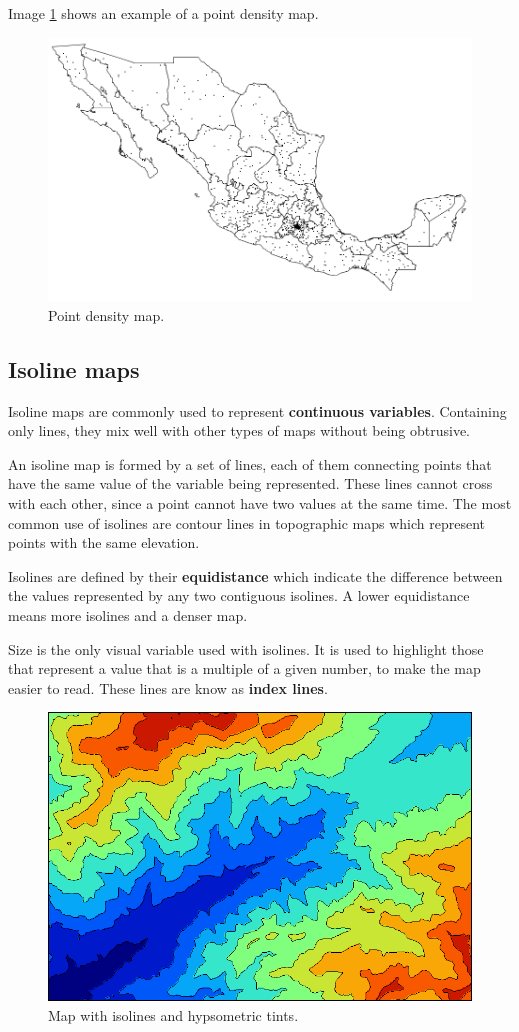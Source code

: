 Image \ref{Fig:MapPoints} shows an example of a point density map.


\begin{figure}[!hbt]
\centering
\includegraphics[width=.8\columnwidth]{Visualization/MapPoints.png}
\caption{\small Point density map.}
\label{Fig:MapPoints} 
\end{figure}


\subsection{Isoline maps}

Isoline maps are commonly used to represent \textbf{continuous variables}. Containing only lines, they mix well with other types of maps without being  obtrusive.

An isoline map is formed by a set of lines, each of them connecting points that have the same value of the variable being represented. These lines cannot cross with each other, since a point cannot have two values at the same time. The most common use of isolines are contour lines in topographic maps which represent points with the same elevation.

Isolines are defined by their \textbf{equidistance} which indicate the difference between the values represented by any two contiguous isolines. A lower equidistance means more isolines and a denser map.

Size is the only visual variable used with isolines. It is used to highlight those that represent a value that is a multiple of a given number, to make the map easier to read. These lines are know as \textbf{index lines}.


\begin{figure}[!hbt]
\centering
\includegraphics[width=.8\columnwidth]{Visualization/Isolines.png}
\caption{\small Map with isolines and hypsometric tints.}
\label{Fig:Isolines} 
\end{figure}


